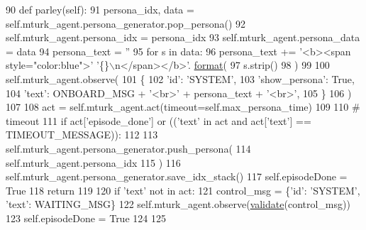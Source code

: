 \begin{DoxyCode}
90     \textcolor{keyword}{def }parley(self):
91         persona\_idx, data = self.mturk\_agent.persona\_generator.pop\_persona()
92         self.mturk\_agent.persona\_idx = persona\_idx
93         self.mturk\_agent.persona\_data = data
94         persona\_text = \textcolor{stringliteral}{''}
95         \textcolor{keywordflow}{for} s \textcolor{keywordflow}{in} data:
96             persona\_text += \textcolor{stringliteral}{'<b><span style="color:blue">'} \textcolor{stringliteral}{'\{\}\(\backslash\)n</span></b>'}.
      \hyperlink{namespaceparlai_1_1chat__service_1_1services_1_1messenger_1_1shared__utils_a32e2e2022b824fbaf80c747160b52a76}{format}(
97                 s.strip()
98             )
99 
100         self.mturk\_agent.observe(
101             \{
102                 \textcolor{stringliteral}{'id'}: \textcolor{stringliteral}{'SYSTEM'},
103                 \textcolor{stringliteral}{'show\_persona'}: \textcolor{keyword}{True},
104                 \textcolor{stringliteral}{'text'}: ONBOARD\_MSG + \textcolor{stringliteral}{'<br>'} + persona\_text + \textcolor{stringliteral}{'<br>'},
105             \}
106         )
107 
108         act = self.mturk\_agent.act(timeout=self.max\_persona\_time)
109 
110         \textcolor{comment}{# timeout}
111         \textcolor{keywordflow}{if} act[\textcolor{stringliteral}{'episode\_done'}] \textcolor{keywordflow}{or} ((\textcolor{stringliteral}{'text'} \textcolor{keywordflow}{in} act \textcolor{keywordflow}{and} act[\textcolor{stringliteral}{'text'}] == TIMEOUT\_MESSAGE)):
112 
113             self.mturk\_agent.persona\_generator.push\_persona(
114                 self.mturk\_agent.persona\_idx
115             )
116             self.mturk\_agent.persona\_generator.save\_idx\_stack()
117             self.episodeDone = \textcolor{keyword}{True}
118             \textcolor{keywordflow}{return}
119 
120         \textcolor{keywordflow}{if} \textcolor{stringliteral}{'text'} \textcolor{keywordflow}{not} \textcolor{keywordflow}{in} act:
121             control\_msg = \{\textcolor{stringliteral}{'id'}: \textcolor{stringliteral}{'SYSTEM'}, \textcolor{stringliteral}{'text'}: WAITING\_MSG\}
122             self.mturk\_agent.observe(\hyperlink{namespaceparlai_1_1core_1_1worlds_afc3fad603b7bce41dbdc9cdc04a9c794}{validate}(control\_msg))
123             self.episodeDone = \textcolor{keyword}{True}
124 
125 
\end{DoxyCode}


